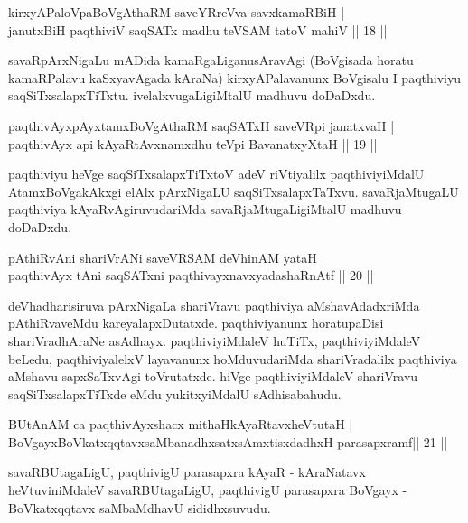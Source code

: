 \begin{shl}
kirxyAPaloVpaBoVgAthaRM saveYRreVva savxkamaRBiH |\\
janutxBiH paqthiviV saqSATx madhu teVSAM tatoV mahiV \hfill || 18 || 
\end{shl}
\begin{artha}
savaRpArxNigaLu mADida kamaRgaLiganusAravAgi (BoVgisada horatu kamaRPalavu kaSxyavAgada kAraNa) kirxyAPalavanunx BoVgisalu I paqthiviyu saqSiTxsalapxTiTxtu. ivelalxvugaLigiMtalU madhuvu doDaDxdu.
\end{artha}
\begin{shl}
paqthivAyx\s pAyxtamxBoVgAthaRM saqSATxH saveVR\s pi janatxvaH |\\
paqthivAyx api kAyaRtAvxnamxdhu teV\s pi BavanatxyXtaH \hfill || 19 ||
\end{shl}
\begin{artha}
paqthiviyu heVge saqSiTxsalapxTiTxtoV adeV riVtiyalilx paqthiviyiMdalU AtamxBoVgakAkxgi elAlx pArxNigaLU saqSiTxsalapxTaTxvu. savaRjaMtugaLU paqthiviya kAyaRvAgiruvudariMda savaRjaMtugaLigiMtalU madhuvu doDaDxdu.
\end{artha}
\begin{shl}
pAthiRvAni shariVrANi saveVRSAM deVhinAM yataH |\\
paqthivAyx tAni saqSATxni paqthivayxnavxyadashaRnAtf \hfill  || 20 || 
\end{shl}
\begin{artha}
deVhadharisiruva pArxNigaLa shariVravu paqthiviya aMshavAdadxriMda pAthiRvaveMdu kareyalapxDutatxde. paqthiviyanunx horatupaDisi shariVradhAraNe asAdhayx. paqthiviyiMdaleV huTiTx, paqthiviyiMdaleV beLedu,  paqthiviyalelxV layavanunx hoMduvudariMda shariVradalilx paqthiviya aMshavu sapxSaTxvAgi toVrutatxde. hiVge paqthiviyiMdaleV shariVravu saqSiTxsalapxTiTxde eMdu yukitxyiMdalU sAdhisabahudu.  
\end{artha}
\begin{shl}
BUtAnAM ca paqthivAyxshacx mithaHkAyaRtavxheVtutaH |\\
BoVgayxBoVkatxqqtavxsaMbanadhxsatxsAmxtisxdadhxH parasapxramf\hfill  || 21 || 
\end{shl}
\begin{artha}
savaRBUtagaLigU, paqthivigU parasapxra kAyaR - kAraNatavx heVtuviniMdaleV savaRBUtagaLigU, paqthivigU parasapxra BoVgayx - BoVkatxqqtavx saMbaMdhavU sididhxsuvudu.
\end{artha}
